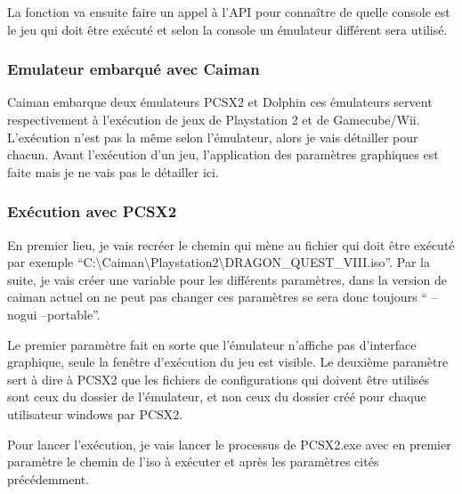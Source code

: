 \documentclass[a4paper,12pt,french]{sphinxmanual}
\begin{document}
\sphinxAtStartPar
La fonction va ensuite faire un appel à l’API pour connaître de quelle console est le jeu qui doit être exécuté et selon la console un émulateur différent sera utilisé.


\subsubsection{Emulateur embarqué avec Caiman}
\label{\detokenize{organique:emulateur-embarque-avec-caiman}}
\sphinxAtStartPar
Caiman embarque deux émulateurs PCSX2 et Dolphin ces émulateurs servent respectivement à l’exécution de jeux de Playstation 2 et de Gamecube/Wii. L’exécution n’est pas la même selon l’émulateur, alors je vais détailler pour chacun. Avant l’exécution d’un jeu, l’application des paramètres graphiques est faite mais je ne vais pas le détailler ici.


\subsubsection{Exécution avec PCSX2}
\label{\detokenize{organique:execution-avec-pcsx2}}
\sphinxAtStartPar
En premier lieu, je vais recréer le chemin qui mène au fichier qui doit être exécuté par exemple “C:\textbackslash{}Caiman\textbackslash{}Playstation2\textbackslash{}DRAGON\_QUEST\_VIII.iso”. Par la suite, je vais créer une variable pour les différents paramètres, dans la version de caiman actuel on ne peut pas changer ces paramètres se sera donc toujours “ –nogui –portable”.

\sphinxAtStartPar
Le premier paramètre fait en sorte que l’émulateur n’affiche pas d’interface graphique, seule la fenêtre d’exécution du jeu est visible. Le deuxième paramètre sert à dire à PCSX2 que les fichiers de configurations qui doivent être utilisés sont ceux du dossier de l’émulateur, et non ceux du dossier créé pour chaque utilisateur windows par PCSX2.

\sphinxAtStartPar
Pour lancer l’exécution, je vais lancer le processus de PCSX2.exe avec en premier paramètre le chemin de l’iso à exécuter et après les paramètres cités précédemment.
\end{document}
